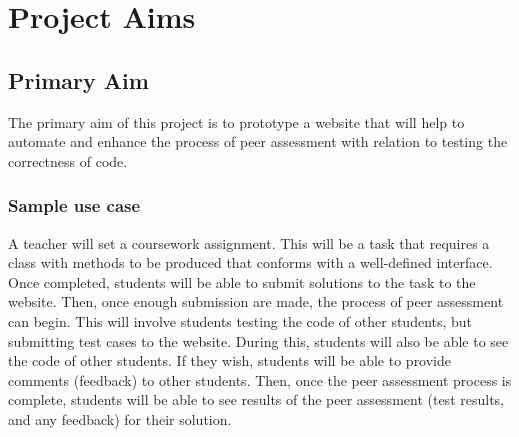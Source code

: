 \documentclass[a4paper,11pt]{report}
\begin{document}
\chapter{Project Aims}
\section{Primary Aim}
The primary aim of this project is to prototype a website that will help to automate and enhance the process of peer assessment with relation to testing the correctness of code.
\subsection*{Sample use case}
A teacher will set a coursework assignment. This will be a task that requires a class with methods to be produced that conforms with a well-defined interface. Once completed, students will be able to submit solutions to the task to the website. Then, once enough submission are made, the process of peer assessment can begin. This will involve students testing the code of other students, but submitting test cases to the website. During this, students will also be able to see the code of other students. If they wish, students will be able to provide comments (feedback) to other students. Then, once the peer assessment process is complete, students will be able to see results of the peer assessment (test results, and any feedback) for their solution.
\end{document}

